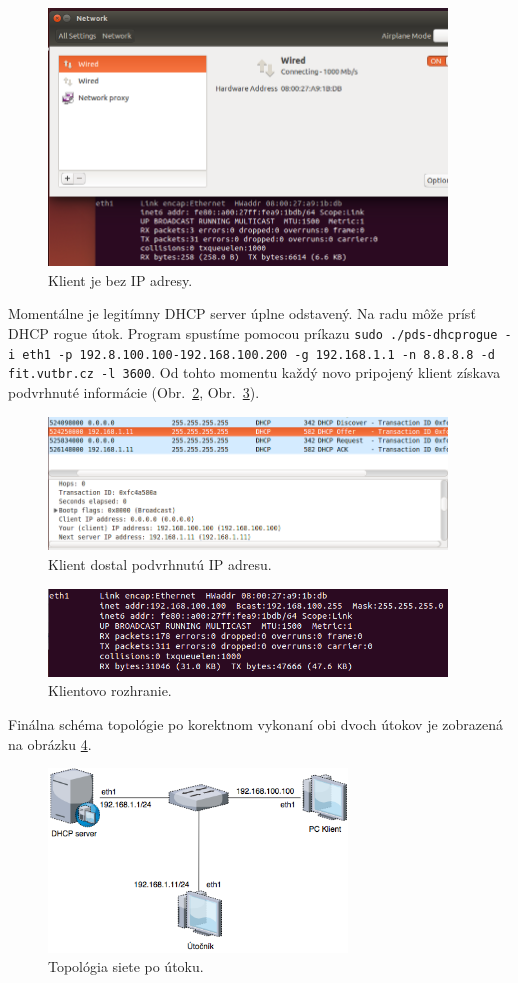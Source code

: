 \documentclass{article}
\begin{document}
\begin{figure}[h]
    \centering
    \includegraphics[width=400px]{pic/3.png}
    \caption{Klient je bez IP adresy.}
    \label{fig:3}
\end{figure}

 Momentálne je legitímny DHCP server úplne odstavený. Na radu môže prísť DHCP rogue útok. Program spustíme pomocou príkazu \texttt{sudo ./pds-dhcprogue -i eth1 -p 192.8.100.100-192.168.100.200 -g 192.168.1.1 -n 8.8.8.8 -d fit.vutbr.cz -l 3600}. Od tohto momentu každý novo pripojený klient získava podvrhnuté informácie (Obr.~\ref{fig:4}, Obr.~\ref{fig:5}).

\begin{figure}[h]
    \centering
    \includegraphics[width=400px]{pic/8.png}
    \caption{Klient dostal podvrhnutú IP adresu.}
    \label{fig:4}
\end{figure}

\begin{figure}[h]
    \centering
    \includegraphics[width=400px]{pic/9.png}
    \caption{Klientovo rozhranie.}
    \label{fig:5}
\end{figure}

Finálna schéma topológie po korektnom vykonaní obi dvoch útokov je zobrazená na obrázku \ref{fig:diagramsite2}.

\begin{figure}[h]
    \centering
    \includegraphics[width=300px]{pic/diagramsite2.png}
    \caption{Topológia siete po útoku.}
    \label{fig:diagramsite2}
\end{figure}

\newpage

\end{document}
